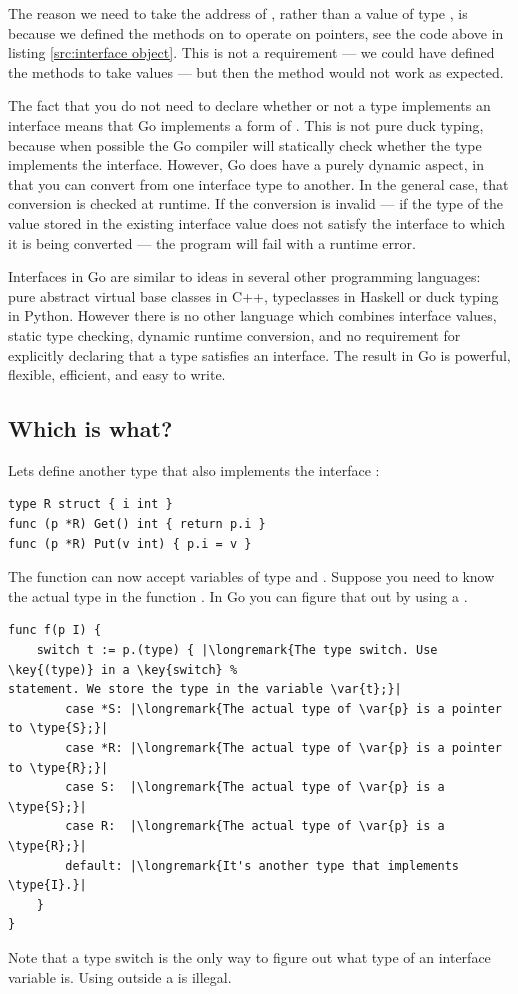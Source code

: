 The reason we need to take the address of , rather than a value of type
, is because we defined the methods on  to operate on
pointers, see the code above in listing \ref{src:interface object}.
This is not a requirement --- we could have defined the methods to take
values --- but then the  method would not work as expected.

The fact that you do not need to declare whether or not a type implements an
interface means that Go implements a form of 
\cite{duck_typing}. 
This is not
pure duck typing, because when possible the Go compiler will statically
check whether the type implements the interface. However, Go does have a
purely dynamic aspect, in that you can convert from one interface type
to another. In the general case, that conversion is checked at runtime.
If the conversion is invalid --- if the type of the value stored in the
existing interface value does not satisfy the interface to which it is
being converted --- the program will fail with a runtime error.

Interfaces in Go are similar to ideas in several other programming languages:
pure abstract virtual base classes in C++, typeclasses in Haskell or duck typing
in Python. However there is no other language which combines
interface values, static type checking, dynamic runtime conversion, and no
requirement for explicitly declaring that a type satisfies an interface. The
result in Go is powerful, flexible, efficient, and easy to write.

\subsection{Which is what?}
Lets define another type that also implements the interface :
\begin{lstlisting}[caption=Another type that implements \type{I}]
type R struct { i int }
func (p *R) Get() int { return p.i }
func (p *R) Put(v int) { p.i = v }
\end{lstlisting}
The function  can now accept variables of type  and .
Suppose you need to know the actual type in the function . In Go you can 
figure that out by using a .

\begin{lstlisting}
func f(p I) {
    switch t := p.(type) { |\longremark{The type switch. Use \key{(type)} in a \key{switch} %
statement. We store the type in the variable \var{t};}|
        case *S: |\longremark{The actual type of \var{p} is a pointer to \type{S};}|
        case *R: |\longremark{The actual type of \var{p} is a pointer to \type{R};}|
        case S:  |\longremark{The actual type of \var{p} is a \type{S};}|
        case R:  |\longremark{The actual type of \var{p} is a \type{R};}|
        default: |\longremark{It's another type that implements \type{I}.}|
    }
}
\end{lstlisting}
\showremarks
Note that a type switch is the only way to figure out what type of an interface variable is. Using
 outside a  is illegal.

